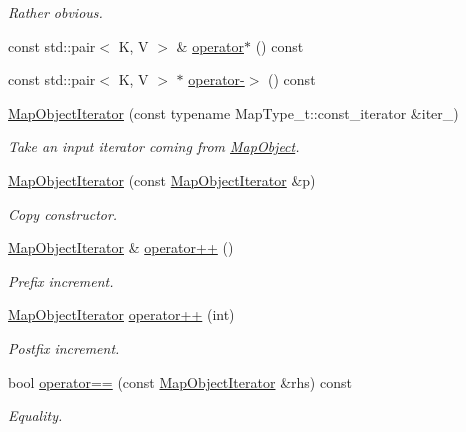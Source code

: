 \begin{DoxyCompactItemize}
\begin{DoxyCompactList}\small\item\em Rather obvious. \end{DoxyCompactList}\item 
const std\+::pair$<$ K, V $>$ \& \mbox{\hyperlink{classADAT_1_1MapObjectIterator_a3faecdcae68181e91e40dad404296ed7}{operator$\ast$}} () const
\item 
const std\+::pair$<$ K, V $>$ $\ast$ \mbox{\hyperlink{classADAT_1_1MapObjectIterator_aa56a13020c9fac807f99312923610dbd}{operator-\/$>$}} () const
\item 
\mbox{\hyperlink{classADAT_1_1MapObjectIterator_a2b23220f6791a2793bb16a898a515926}{Map\+Object\+Iterator}} (const typename Map\+Type\+\_\+t\+::const\+\_\+iterator \&iter\+\_\+)
\begin{DoxyCompactList}\small\item\em Take an input iterator coming from \mbox{\hyperlink{classADAT_1_1MapObject}{Map\+Object}}. \end{DoxyCompactList}\item 
\mbox{\hyperlink{classADAT_1_1MapObjectIterator_a62eb4a3a1c1bab1329e51a3d857d4065}{Map\+Object\+Iterator}} (const \mbox{\hyperlink{classADAT_1_1MapObjectIterator}{Map\+Object\+Iterator}} \&p)
\begin{DoxyCompactList}\small\item\em Copy constructor. \end{DoxyCompactList}\item 
\mbox{\hyperlink{classADAT_1_1MapObjectIterator}{Map\+Object\+Iterator}} \& \mbox{\hyperlink{classADAT_1_1MapObjectIterator_a2eedaf3b2fc70d48afd45bd37c5e6e69}{operator++}} ()
\begin{DoxyCompactList}\small\item\em Prefix increment. \end{DoxyCompactList}\item 
\mbox{\hyperlink{classADAT_1_1MapObjectIterator}{Map\+Object\+Iterator}} \mbox{\hyperlink{classADAT_1_1MapObjectIterator_a90809a5488988dd0d49ce25df35756ae}{operator++}} (int)
\begin{DoxyCompactList}\small\item\em Postfix increment. \end{DoxyCompactList}\item 
bool \mbox{\hyperlink{classADAT_1_1MapObjectIterator_a3153929ca4103b625790fb1d09f33e71}{operator==}} (const \mbox{\hyperlink{classADAT_1_1MapObjectIterator}{Map\+Object\+Iterator}} \&rhs) const
\begin{DoxyCompactList}\small\item\em Equality. \end{DoxyCompactList}\item 

\end{DoxyCompactItemize}
